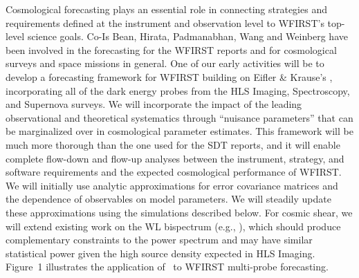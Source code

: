 Cosmological forecasting plays
an essential role in connecting strategies and requirements defined at
the instrument and observation level to WFIRST's top-level science goals.
Co-Is Bean, Hirata, Padmanabhan, Wang and Weinberg have been
involved in the forecasting for the WFIRST reports and
for cosmological surveys and space missions in general.
One of our early activities will be to develop a forecasting
framework for WFIRST building on Eifler \& Krause's \CoLi, incorporating all of the dark
energy probes from the HLS Imaging, Spectroscopy, and Supernova surveys.
We will incorporate the impact of the leading observational and theoretical systematics
through ``nuisance parameters'' that can be marginalized over in cosmological
parameter estimates.  This framework will be much more thorough
than the one used for the SDT reports, and it will enable complete
flow-down and flow-up analyses between the instrument, strategy, and
software requirements and the expected cosmological performance of
WFIRST.  We will initially use analytic approximations for error covariance
matrices and the dependence of observables on model parameters.  We will
steadily update these approximations using the simulations described below.
For cosmic shear, we will extend existing work on the WL bispectrum
(e.g., \cite{Kayo2013,Fu14}), which should
produce complementary constraints to the power spectrum and may have
similar statistical power given the high source density expected in
HLS Imaging.  Figure~1 illustrates the application of \CoLi\ to WFIRST
multi-probe forecasting.

